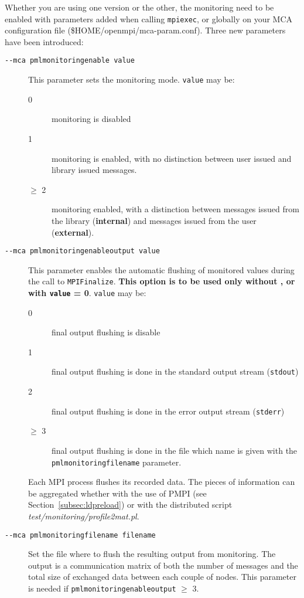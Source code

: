 Whether you are using one version or the other, the monitoring need to
be enabled with parameters added when calling \texttt{mpiexec}, or
globally on your \ompi{} MCA configuration file
(\${HOME}/openmpi/mca-param.conf).  Three new parameters have been
introduced:
\begin{description}
\item [\texttt{-{}-mca pml\brkunds{}monitoring\brkunds{}enable value}]
  This parameter sets the monitoring mode. \texttt{value} may be:
  \begin{description}
  \item [0] monitoring is disabled
  \item [1] monitoring is enabled, with no distinction between user
    issued and library issued messages.
  \item [$\ge$ 2] monitoring enabled, with a distinction between
    messages issued from the library ({\bf internal}) and messages
    issued from the user ({\bf external}).
  \end{description}
\item [\texttt{-{}-mca
    pml\brkunds{}monitoring\brkunds{}enable\brkunds{}output value}]
  This parameter enables the automatic flushing of monitored values
  during the call to \texttt{MPI\brkunds{}Finalize}. {\bf This option
    is to be used only without \mpit{}, or with \texttt{value} =
    0}. \texttt{value} may be:
  \begin{description}
  \item [0] final output flushing is disable
  \item [1] final output flushing is done in the standard output
    stream (\texttt{stdout})
  \item [2] final output flushing is done in the error output stream
    (\texttt{stderr})
  \item [$\ge$ 3] final output flushing is done in the file which name
    is given with the
    \texttt{pml\brkunds{}monitoring\brkunds{}filename} parameter.
  \end{description}
  Each MPI process flushes its recorded data. The pieces of
  information can be aggregated whether with the use of PMPI (see
  Section~\ref{subsec:ldpreload}) or with the distributed script {\it
    test/monitoring/profile2mat.pl}.
\item [\texttt{-{}-mca pml\brkunds{}monitoring\brkunds{}filename
    filename}] Set the file where to flush the resulting output from
  monitoring. The output is a communication matrix of both the number
  of messages and the total size of exchanged data between each couple
  of nodes. This parameter is needed if
  \texttt{pml\brkunds{}monitoring\brkunds{}enable\brkunds{}output}
  $\ge$ 3.
\end{description}


